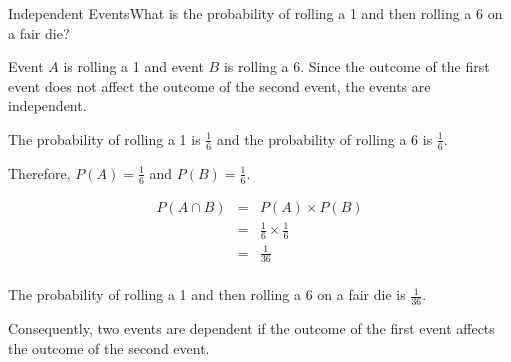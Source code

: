 \begin{wex}{Independent Events}{What is the probability of rolling a 1 and then rolling a 6 on a fair die?}{

Event $A$ is rolling a 1 and event $B$ is rolling a 6. Since the outcome of the first event does not affect the outcome of the second event, the events are independent.


The probability of rolling a 1 is $\frac{1}{6}$ and the probability of rolling a 6 is $\frac{1}{6}$.

Therefore, $P(A)=\frac{1}{6}$ and $P(B)=\frac{1}{6}$.


\begin{eqnarray*}
P(A \cap B) &=& P(A)\times P(B)\\
&=&\frac{1}{6} \times \frac{1}{6}\\
&=&\frac{1}{36}\\
\end{eqnarray*}

The probability of rolling a 1 and then rolling a 6 on a fair die is $\frac{1}{36}$.}
\end{wex}

Consequently, two events are dependent if the outcome of the first event affects the outcome of the second event.

